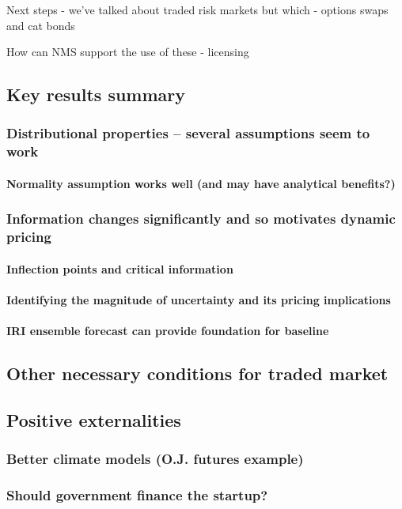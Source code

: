\documentclass[authoryear]{article}
\begin{document}
Next steps - we've talked about traded risk markets but which - options swaps and cat bonds

How can NMS support the use of these - licensing








\subsection{Key results summary}

\subsubsection{Distributional properties – several assumptions seem to work}

\paragraph{Normality assumption works well (and may have analytical benefits?)}

\subsubsection{Information changes significantly and so motivates dynamic pricing}

\paragraph{Inflection points and critical information}

\paragraph{Identifying the magnitude of uncertainty and its pricing implications}

\paragraph{IRI ensemble forecast can provide foundation for baseline}

\subsection{Other necessary conditions for traded market}

\subsection{Positive externalities}

\subsubsection{Better climate models (O.J. futures example)}

\subsubsection{Should government finance the startup?}



\end{document}
